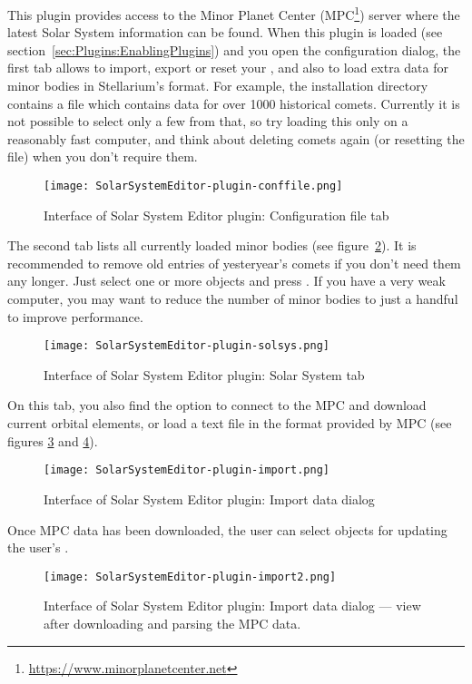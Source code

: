 This plugin provides access to the Minor Planet Center (MPC\footnote{\url{https://www.minorplanetcenter.net}}) server where the latest Solar System information can be found. When this plugin is
loaded (see section~\ref{sec:Plugins:EnablingPlugins}) and you open the configuration dialog, the first tab allows to import, export or reset your , 
and also to load extra data for minor bodies in Stellarium's  format. 
For example, the installation directory contains a file  which contains 
data for over 1000 historical comets. Currently it is not possible to select only a few from that, 
so try loading this only on a reasonably fast computer, and think about deleting comets again (or resetting the file) when you don't require them.

\begin{figure}[th]\centering
	\texttt{[image: SolarSystemEditor-plugin-conffile.png]}
	\caption{Interface of Solar System Editor plugin: Configuration file tab}
	\label{fig:SolarSystemEditor:ConfigurationFile}
\end{figure}

The second tab lists all currently loaded minor bodies (see figure~\ref{fig:SolarSystemEditor:SolarSystem}).  It is recommended
to remove old entries of yesteryear's comets if you don't need them any
longer. Just select one or more objects and press .
If you have a very weak computer, you may want to reduce the number of
minor bodies to just a handful to improve performance.

\begin{figure}[th]\centering
	\texttt{[image: SolarSystemEditor-plugin-solsys.png]}
	\caption{Interface of Solar System Editor plugin: Solar System tab}
	\label{fig:SolarSystemEditor:SolarSystem}
\end{figure}

On this tab, you also find the option to connect to the MPC and download current orbital elements, 
or load a text file in the format provided by MPC (see figures \ref{fig:SolarSystemEditor:ImportData:InitialView} and \ref{fig:SolarSystemEditor:ImportData:FinalView}). 

\begin{figure}[th]\centering
\texttt{[image: SolarSystemEditor-plugin-import.png]}
\caption{Interface of Solar System Editor plugin: Import data dialog}
\label{fig:SolarSystemEditor:ImportData:InitialView}
\end{figure}

Once MPC data has been downloaded, the user can select objects for updating the user's .

\begin{figure}[th]\centering
\texttt{[image: SolarSystemEditor-plugin-import2.png]}
\caption{Interface of Solar System Editor plugin: Import data dialog --- view after downloading and parsing the MPC data.}
\label{fig:SolarSystemEditor:ImportData:FinalView}
\end{figure}



